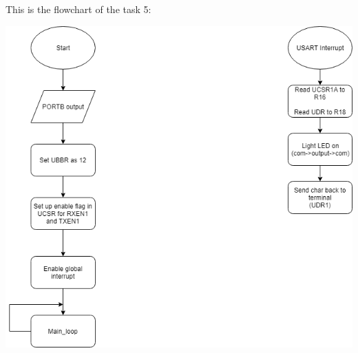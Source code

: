 \documentclass[a4paper,12pt]{article}
\begin{document}
This is the flowchart of the task 5:
\begin{center}
\includegraphics[scale=0.7]{img/Task5.png}
\end{center}



\end{document}
